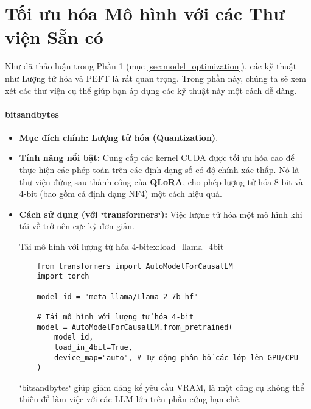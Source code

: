 
\section{Tối ưu hóa Mô hình với các Thư viện Sẵn có}
\label{sec:model_optimization_libraries}
Như đã thảo luận trong Phần 1 (mục \ref{sec:model_optimization}), các kỹ thuật như Lượng tử hóa và PEFT là rất quan trọng. Trong phần này, chúng ta sẽ xem xét các thư viện cụ thể giúp bạn áp dụng các kỹ thuật này một cách dễ dàng.

\paragraph{bitsandbytes}
\begin{itemize}
    \item \textbf{Mục đích chính:} \textbf{Lượng tử hóa (Quantization)}.
    \item \textbf{Tính năng nổi bật:} Cung cấp các kernel CUDA được tối ưu hóa cao để thực hiện các phép toán trên các định dạng số có độ chính xác thấp. Nó là thư viện đứng sau thành công của \textbf{QLoRA}, cho phép lượng tử hóa 8-bit và 4-bit (bao gồm cả định dạng NF4) một cách hiệu quả.
    \item \textbf{Cách sử dụng (với `transformers`):} Việc lượng tử hóa một mô hình khi tải về trở nên cực kỳ đơn giản.
    \begin{example}{Tải mô hình với lượng tử hóa 4-bit}{ex:load_llama_4bit}
    \begin{verbatim}
    from transformers import AutoModelForCausalLM
    import torch

    model_id = "meta-llama/Llama-2-7b-hf"

    # Tải mô hình với lượng tử hóa 4-bit
    model = AutoModelForCausalLM.from_pretrained(
        model_id,
        load_in_4bit=True,
        device_map="auto", # Tự động phân bổ các lớp lên GPU/CPU
    )
    \end{verbatim}
    \end{example}
    `bitsandbytes` giúp giảm đáng kể yêu cầu VRAM, là một công cụ không thể thiếu để làm việc với các LLM lớn trên phần cứng hạn chế.
\end{itemize}

